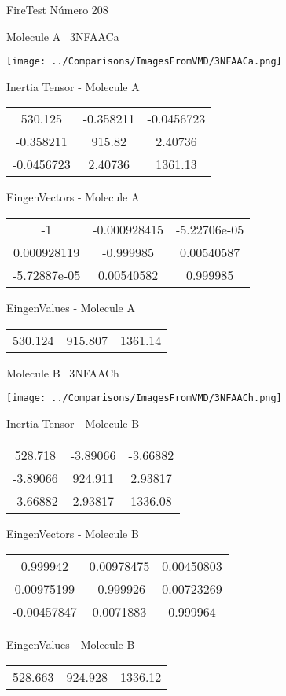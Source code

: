 \vtab[-3cm]
\begin{center}
{\large FireTest \tab Número 208}
\end{center}
\begin{multicols}{2}
\begin{center}

Molecule A \
3NFAACa

\texttt{[image: ../Comparisons/ImagesFromVMD/3NFAACa.png]}

Inertia Tensor - Molecule A \\
\begin{tabular}{|c c c|}
530.125	 & 	-0.358211	 & 	-0.0456723	 \\
-0.358211	 & 	915.82	 & 	2.40736	 \\
-0.0456723	 & 	2.40736	 & 	1361.13
\end{tabular}

\vtab
 EingenVectors - Molecule A     \\
\begin{tabular}{|c c c|}
-1	 & 	-0.000928415	 & 	-5.22706e-05	 \\
0.000928119	 & 	-0.999985	 & 	0.00540587	 \\
-5.72887e-05	 & 	0.00540582	 & 	0.999985
\end{tabular}

\vtab
 EingenValues - Molecule A     \\
\begin{tabular}{|c c c|}
530.124	 & 	915.807	 & 	1361.14	 \\
\end{tabular}
\columnbreak

Molecule B \
3NFAACh

\texttt{[image: ../Comparisons/ImagesFromVMD/3NFAACh.png]}

Inertia Tensor - Molecule B \\
\begin{tabular}{|c c c|}
528.718	 & 	-3.89066	 & 	-3.66882	 \\
-3.89066	 & 	924.911	 & 	2.93817	 \\
-3.66882	 & 	2.93817	 & 	1336.08
\end{tabular}

\vtab
 EingenVectors - Molecule B     \\
\begin{tabular}{|c c c|}
0.999942	 & 	0.00978475	 & 	0.00450803	 \\
0.00975199	 & 	-0.999926	 & 	0.00723269	 \\
-0.00457847	 & 	0.0071883	 & 	0.999964
\end{tabular}

\vtab
 EingenValues - Molecule B     \\
\begin{tabular}{|c c c|}
528.663	 & 	924.928	 & 	1336.12	 \\
\end{tabular}

\end{center}
\end{multicols}

